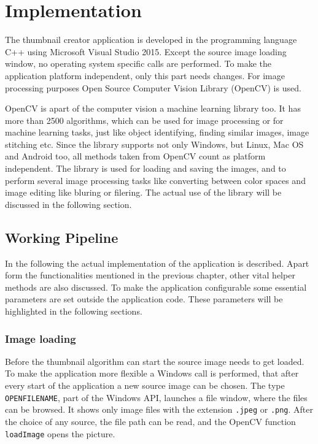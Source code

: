 \documentclass[draft,final]{vutinfth} %
\begin{document}
\chapter{Implementation}
The thumbnail creator application is developed in the programming language C++ using Microsoft Visual Studio 2015.
Except the source image loading window, no operating system specific calls are performed.
To make the application platform independent, only this part needs changes.
For image processing purposes Open Source Computer Vision Library (OpenCV) is used.\par 
OpenCV is apart of the computer vision a machine learning library too.     
It has more than 2500 algorithms, which can be used for image processing or for machine learning tasks, just like object identifying, finding similar images, image stitching etc.
Since the library supports not only Windows, but Linux, Mac OS and Android too, all methods taken from OpenCV count as platform independent.
The library is used for loading and saving the images, and to perform several image processing tasks like converting between color spaces and image editing like bluring or filering.
The actual use of the library will be discussed in the following section.

\section{Working Pipeline}
In the following the actual implementation of the application is described.
Apart form the functionalities mentioned in the previous chapter, other vital helper methods are also discussed.
To make the application configurable some essential parameters are set outside the application code. These parameters will be highlighted in the following sections.

\subsection{Image loading}
Before the thumbnail algorithm can start the source image needs to get loaded.
To make the application more flexible a Windows call is performed, that after every start of the application a new source image can be chosen.
The type \texttt{OPENFILENAME}, part of the Windows API, launches a file window, where the files can be browsed.
It shows only image files with the extension \texttt{.jpeg} or \texttt{.png}.
After the choice of any source, the file path can be read, and the OpenCV function \texttt{loadImage} opens the picture.
\end{document}
